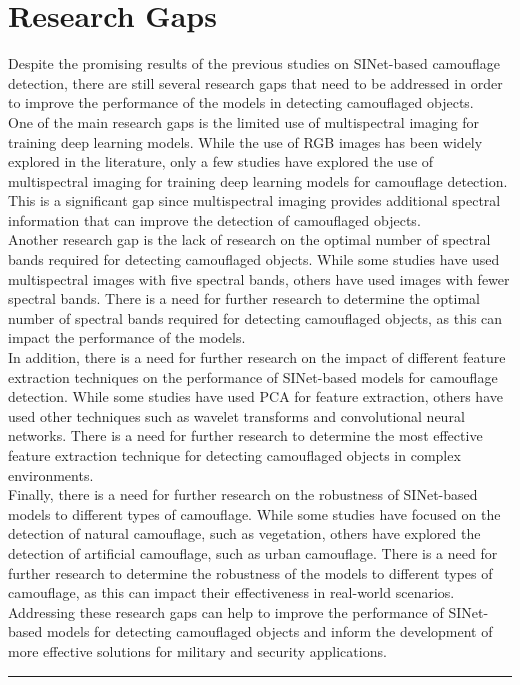 \section{{{\fontsize{17}{21}\selectfont \textbf{Research Gaps}}}}
\setlength{\columnsep}{1.5cm}

\begin{multicols}{2}

Despite the promising results of the previous studies on SINet-based camouflage detection, there are still several research gaps that need to be addressed in order to improve the performance of the models in detecting camouflaged objects.\\
One of the main research gaps is the limited use of multispectral imaging for training deep learning models. While the use of RGB images has been widely explored in the literature, only a few studies have explored the use of multispectral imaging for training deep learning models for camouflage detection. This is a significant gap since multispectral imaging provides additional spectral information that can improve the detection of camouflaged objects.\\
Another research gap is the lack of research on the optimal number of spectral bands required for detecting camouflaged objects. While some studies have used multispectral images with five spectral bands, others have used images with fewer spectral bands. There is a need for further research to determine the optimal number of spectral bands required for detecting camouflaged objects, as this can impact the performance of the models.\\
In addition, there is a need for further research on the impact of different feature extraction techniques on the performance of SINet-based models for camouflage detection. While some studies have used PCA for feature extraction, others have used other techniques such as wavelet transforms and convolutional neural networks. There is a need for further research to determine the most effective feature extraction technique for detecting camouflaged objects in complex environments.\\
Finally, there is a need for further research on the robustness of SINet-based models to different types of camouflage. While some studies have focused on the detection of natural camouflage, such as vegetation, others have explored the detection of artificial camouflage, such as urban camouflage. There is a need for further research to determine the robustness of the models to different types of camouflage, as this can impact their effectiveness in real-world scenarios.\\
Addressing these research gaps can help to improve the performance of SINet-based models for detecting camouflaged objects and inform the development of more effective solutions for military and security applications.
\end{multicols}

\vspace{0.5cm}
{\color{gray}\hrule}
\vspace{0.5cm}
